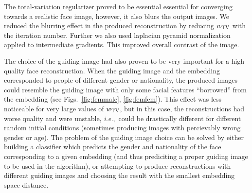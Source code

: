 \documentclass{article}
\def\wtv{w_{\rm TV}}
\newcommand{\Figs}[1]{Figs.~\ref{#1}}
\newcommand{\hairsp}{\hspace{1pt}}
\def \ie{{\mbox{\textit{i.\hairsp{}e.},~}}}
\begin{document}
  The total-variation regularizer proved to be essential essential for converging towards a realistic face image, however, it also blurs the output images.
  We reduced the blurring effect in the produced reconstruction by reducing $\wtv$ with the iteration number.
  Further we also used laplacian pyramid normalization~\cite{mordvintsev:15} applied to intermediate gradients.
  This improved overall contrast of the image. %

  The choice of the guiding image had also proven to be very important for a high quality face reconstruction.
  When the guiding image and the embedding corresponded to people of different gender or nationality, the produced images could resemble the guiding image with only some facial features ``borrowed'' from the embedding (see \Figs{fig:femmale}, \ref{fig:femfem}).
  This effect was less noticeable for very large values of $\wtv$, but in this case, the reconstructions had worse quality and were unstable, \ie could be drastically different for different random initial conditions (sometimes producing images with percievably wrong gender or age).
  The problem of the guiding image choice can be solved by either building a classifier which predicts the gender and nationality of the face corresponding to a given embedding (and thus prediciting a proper guiding image to be used in the algorithm), or attempting to produce reconstructions with different guiding images and choosing the result with the smallest embedding space distance.
\end{document}
